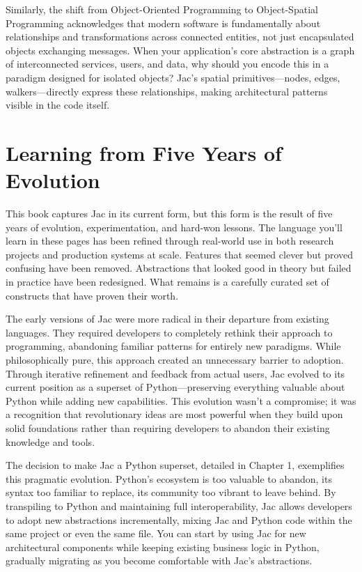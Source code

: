 Similarly, the shift from Object-Oriented Programming to Object-Spatial Programming acknowledges that modern software is fundamentally about relationships and transformations across connected entities, not just encapsulated objects exchanging messages. When your application's core abstraction is a graph of interconnected services, users, and data, why should you encode this in a paradigm designed for isolated objects? Jac's spatial primitives—nodes, edges, walkers—directly express these relationships, making architectural patterns visible in the code itself.

\section{Learning from Five Years of Evolution}

This book captures Jac in its current form, but this form is the result of five years of evolution, experimentation, and hard-won lessons. The language you'll learn in these pages has been refined through real-world use in both research projects and production systems at scale. Features that seemed clever but proved confusing have been removed. Abstractions that looked good in theory but failed in practice have been redesigned. What remains is a carefully curated set of constructs that have proven their worth.

The early versions of Jac were more radical in their departure from existing languages. They required developers to completely rethink their approach to programming, abandoning familiar patterns for entirely new paradigms. While philosophically pure, this approach created an unnecessary barrier to adoption. Through iterative refinement and feedback from actual users, Jac evolved to its current position as a superset of Python—preserving everything valuable about Python while adding new capabilities. This evolution wasn't a compromise; it was a recognition that revolutionary ideas are most powerful when they build upon solid foundations rather than requiring developers to abandon their existing knowledge and tools.

The decision to make Jac a Python superset, detailed in Chapter 1, exemplifies this pragmatic evolution. Python's ecosystem is too valuable to abandon, its syntax too familiar to replace, its community too vibrant to leave behind. By transpiling to Python and maintaining full interoperability, Jac allows developers to adopt new abstractions incrementally, mixing Jac and Python code within the same project or even the same file. You can start by using Jac for new architectural components while keeping existing business logic in Python, gradually migrating as you become comfortable with Jac's abstractions.

